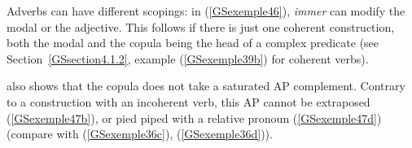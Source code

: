\documentclass[output=paper
                ,modfonts
                ,nonflat
	        ,collection
	        ,collectionchapter
	        ,collectiontoclongg
 	        ,biblatex
                ,babelshorthands
                ,newtxmath
                ,draftmode
                ,colorlinks, citecolor=brown
]{./langsci/langscibook}
\begin{document}
{\begin{exe}
	\ex \label{GSexemple45} 
	\begin{xlist}
        \label{GSexemple45a}

		\label{GSexemple45b}
		\end{xlist}
\end{exe}

Adverbs can have different scopings: in (\ref{GSexemple46}), \textit{immer} can modify the modal or the adjective. This follows if there is just one coherent construction, both the modal and the copula being the head of a complex predicate (see Section~\ref{GSsection4.1.2}, example (\ref{GSexemple39b}) for coherent verbs).

\begin{exe}
	\label{GSexemple46}

\end{exe}

\cite{Mueller2002b} also shows that the copula does not take a saturated AP complement. Contrary to a construction with an incoherent verb, this AP cannot be extraposed (\ref{GSexemple47b}), or pied piped with a relative pronoun (\ref{GSexemple47d}) (compare with (\ref{GSexemple36c}), (\ref{GSexemple36d})).   

\begin{exe}
	\ex \label{GSexemple47} 
	\begin{xlist}
        \label{GSexemple47a}


\end{xlist}
\end{exe}}
\end{document}
